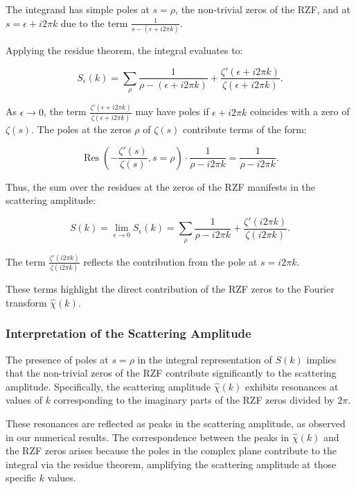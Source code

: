 \documentclass[11pt, oneside]{article}
\begin{document}
The integrand has simple poles at $s = \rho$, the non-trivial zeros of the RZF, and at $s = \epsilon + i 2\pi k$ due to the term $\frac{1}{s - (\epsilon + i 2\pi k)}$.

Applying the residue theorem, the integral evaluates to:

\begin{equation}
S_\epsilon(k) = \sum_{\rho} \frac{1}{\rho - (\epsilon + i 2\pi k)} + \frac{\zeta'(\epsilon + i 2\pi k)}{\zeta(\epsilon + i 2\pi k)}.
\end{equation}

As $\epsilon \to 0$, the term $\frac{\zeta'(\epsilon + i 2\pi k)}{\zeta(\epsilon + i 2\pi k)}$ may have poles if $\epsilon + i 2\pi k$ coincides with a zero of $\zeta(s)$. The poles at the zeros $\rho$ of $\zeta(s)$ contribute terms of the form:

\begin{equation}
\operatorname{Res}\left(-\frac{\zeta'(s)}{\zeta(s)}, s = \rho\right) \cdot \frac{1}{\rho - i 2\pi k} = \frac{1}{\rho - i 2\pi k}.
\end{equation}

Thus, the sum over the residues at the zeros of the RZF manifests in the scattering amplitude:

\begin{equation}
S(k) = \lim_{\epsilon \to 0} S_\epsilon(k) = \sum_{\rho} \frac{1}{\rho - i 2\pi k} + \frac{\zeta'(i 2\pi k)}{\zeta(i 2\pi k)}.
\end{equation}

The term $\frac{\zeta'(i 2\pi k)}{\zeta(i 2\pi k)}$ reflects the contribution from the pole at $s = i 2\pi k$.

These terms highlight the direct contribution of the RZF zeros to the Fourier transform $\hat{\chi}(k)$.

\subsubsection{Interpretation of the Scattering Amplitude}

The presence of poles at $s = \rho$ in the integral representation of $S(k)$ implies that the non-trivial zeros of the RZF contribute significantly to the scattering amplitude. Specifically, the scattering amplitude $\hat{\chi}(k)$ exhibits resonances at values of $k$ corresponding to the imaginary parts of the RZF zeros divided by $2\pi$.

These resonances are reflected as peaks in the scattering amplitude, as observed in our numerical results. The correspondence between the peaks in $\hat{\chi}(k)$ and the RZF zeros arises because the poles in the complex plane contribute to the integral via the residue theorem, amplifying the scattering amplitude at those specific $k$ values.
\end{document}
